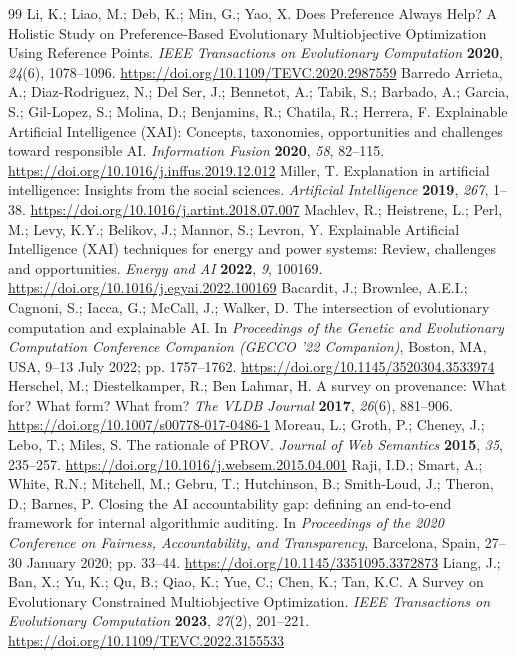 \documentclass[energies,article,submit,moreauthors]{Definitions/mdpi}
\begin{document}
\begin{thebibliography}{99}
 Li, K.; Liao, M.; Deb, K.; Min, G.; Yao, X. Does Preference Always Help? A Holistic Study on Preference-Based Evolutionary Multiobjective Optimization Using Reference Points. \emph{IEEE Transactions on Evolutionary Computation} \textbf{2020}, \emph{24}(6), 1078--1096. \url{https://doi.org/10.1109/TEVC.2020.2987559}
 Barredo Arrieta, A.; Diaz-Rodriguez, N.; Del Ser, J.; Bennetot, A.; Tabik, S.; Barbado, A.; Garcia, S.; Gil-Lopez, S.; Molina, D.; Benjamins, R.; Chatila, R.; Herrera, F. Explainable Artificial Intelligence (XAI): Concepts, taxonomies, opportunities and challenges toward responsible AI. \emph{Information Fusion} \textbf{2020}, \emph{58}, 82--115. \url{https://doi.org/10.1016/j.inffus.2019.12.012}
 Miller, T. Explanation in artificial intelligence: Insights from the social sciences. \emph{Artificial Intelligence} \textbf{2019}, \emph{267}, 1--38. \url{https://doi.org/10.1016/j.artint.2018.07.007}
 Machlev, R.; Heistrene, L.; Perl, M.; Levy, K.Y.; Belikov, J.; Mannor, S.; Levron, Y. Explainable Artificial Intelligence (XAI) techniques for energy and power systems: Review, challenges and opportunities. \emph{Energy and AI} \textbf{2022}, \emph{9}, 100169. \url{https://doi.org/10.1016/j.egyai.2022.100169}
 Bacardit, J.; Brownlee, A.E.I.; Cagnoni, S.; Iacca, G.; McCall, J.; Walker, D. The intersection of evolutionary computation and explainable AI. In \emph{Proceedings of the Genetic and Evolutionary Computation Conference Companion (GECCO '22 Companion)}, Boston, MA, USA, 9--13 July 2022; pp. 1757--1762. \url{https://doi.org/10.1145/3520304.3533974}
 Herschel, M.; Diestelkamper, R.; Ben Lahmar, H. A survey on provenance: What for? What form? What from? \emph{The VLDB Journal} \textbf{2017}, \emph{26}(6), 881--906. \url{https://doi.org/10.1007/s00778-017-0486-1}
 Moreau, L.; Groth, P.; Cheney, J.; Lebo, T.; Miles, S. The rationale of PROV. \emph{Journal of Web Semantics} \textbf{2015}, \emph{35}, 235--257. \url{https://doi.org/10.1016/j.websem.2015.04.001}
 Raji, I.D.; Smart, A.; White, R.N.; Mitchell, M.; Gebru, T.; Hutchinson, B.; Smith-Loud, J.; Theron, D.; Barnes, P. Closing the AI accountability gap: defining an end-to-end framework for internal algorithmic auditing. In \emph{Proceedings of the 2020 Conference on Fairness, Accountability, and Transparency}, Barcelona, Spain, 27--30 January 2020; pp. 33--44. \url{https://doi.org/10.1145/3351095.3372873}
 Liang, J.; Ban, X.; Yu, K.; Qu, B.; Qiao, K.; Yue, C.; Chen, K.; Tan, K.C. A Survey on Evolutionary Constrained Multiobjective Optimization. \emph{IEEE Transactions on Evolutionary Computation} \textbf{2023}, \emph{27}(2), 201--221. \url{https://doi.org/10.1109/TEVC.2022.3155533}

\end{thebibliography}
\end{document}
